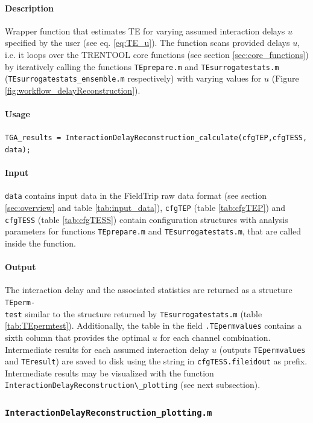 \documentclass[a4paper,10pt]{article}
\begin{document}
\paragraph*{Description} Wrapper function that estimates TE for varying assumed interaction delays $u$ specified by the user (see eq. \ref{eq:TE_u}). The function scans provided delays $u$, i.e. it loops over the TRENTOOL core functions (see section \ref{sec:core_functions}) by iteratively calling the functions \verb&TEprepare.m& and \verb&TEsurrogatestats.m& (\verb&TEsurrogatestats_ensemble.m& respectively) with varying values for $u$ (Figure \ref{fig:workflow_delayReconstruction}). 

\paragraph*{Usage} \texttt{TGA\_results = InteractionDelayReconstruction\_calculate(cfgTEP,cfgTESS,\\data);}

\paragraph*{Input} \texttt{data} contains input data in the FieldTrip raw data format (see section \ref{sec:overview} and table \ref{tab:input_data}), \verb&cfgTEP& (table \ref{tab:cfgTEP}) and \verb&cfgTESS& (table \ref{tab:cfgTESS}) contain configuration structures with analysis parameters for functions \verb&TEprepare.m& and \verb&TEsurrogatestats.m&, that are called inside the function.

\paragraph*{Output} The interaction delay and the associated statistics are returned as a structure \texttt{TEperm-\\test} similar to the structure returned by \verb&TEsurrogatestats.m& (table \ref{tab:TEpermtest}). Additionally, the table in the field \verb&.TEpermvalues& contains a sixth column that provides the optimal $u$ for each channel combination. Intermediate results for each assumed interaction delay $u$ (outputs \texttt{TEpermvalues} and \texttt{TEresult}) are saved to disk using the string in \texttt{cfgTESS.fileidout} as prefix. Intermediate results may be visualized with the function \verb&InteractionDelayReconstruction\_plotting& (see next subsection).

\subsubsection{\texttt{InteractionDelayReconstruction\_plotting.m}} 
\end{document}
